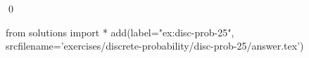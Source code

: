 
\begin{ex} 
  \label{ex:disc-prob-25}
  
  \qed
\end{ex} 
\begin{python0}
from solutions import *
add(label="ex:disc-prob-25",
    srcfilename='exercises/discrete-probability/disc-prob-25/answer.tex') 
\end{python0}
